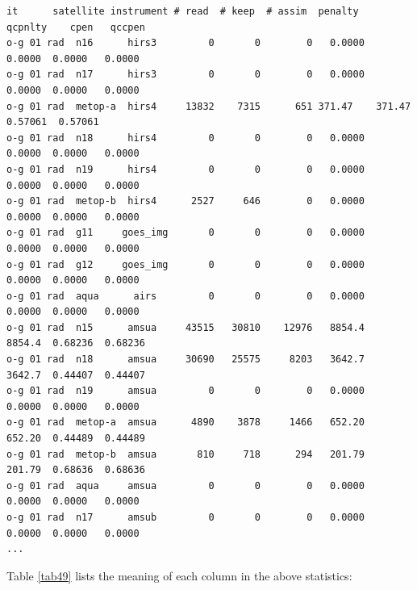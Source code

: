 \begin{itemize}[leftmargin=*]
\begin{scriptsize}
\begin{verbatim}
it      satellite instrument # read  # keep  # assim  penalty   qcpnlty    cpen   qccpen
o-g 01 rad  n16      hirs3         0       0        0   0.0000    0.0000  0.0000   0.0000
o-g 01 rad  n17      hirs3         0       0        0   0.0000    0.0000  0.0000   0.0000
o-g 01 rad  metop-a  hirs4     13832    7315      651 371.47    371.47    0.57061  0.57061
o-g 01 rad  n18      hirs4         0       0        0   0.0000    0.0000  0.0000   0.0000
o-g 01 rad  n19      hirs4         0       0        0   0.0000    0.0000  0.0000   0.0000
o-g 01 rad  metop-b  hirs4      2527     646        0   0.0000    0.0000  0.0000   0.0000
o-g 01 rad  g11     goes_img       0       0        0   0.0000    0.0000  0.0000   0.0000
o-g 01 rad  g12     goes_img       0       0        0   0.0000    0.0000  0.0000   0.0000
o-g 01 rad  aqua      airs         0       0        0   0.0000    0.0000  0.0000   0.0000
o-g 01 rad  n15      amsua     43515   30810    12976   8854.4    8854.4  0.68236  0.68236
o-g 01 rad  n18      amsua     30690   25575     8203   3642.7    3642.7  0.44407  0.44407
o-g 01 rad  n19      amsua         0       0        0   0.0000    0.0000  0.0000   0.0000
o-g 01 rad  metop-a  amsua      4890    3878     1466   652.20    652.20  0.44489  0.44489
o-g 01 rad  metop-b  amsua       810     718      294   201.79    201.79  0.68636  0.68636
o-g 01 rad  aqua     amsua         0       0        0   0.0000    0.0000  0.0000   0.0000
o-g 01 rad  n17      amsub         0       0        0   0.0000    0.0000  0.0000   0.0000
...
\end{verbatim}
\end{scriptsize}

Table \ref{tab49} lists the meaning of each column in the above statistics:


\end{itemize}
